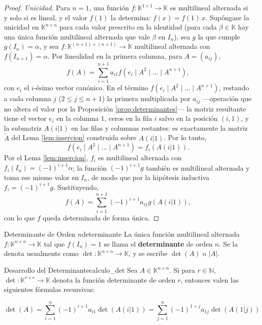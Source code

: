 \documentclass[11pt, a4paper]{article}
\begin{document}
\begin{proof}
\textit{Unicidad.} Para $n=1$, una función $f: \mathbb{K}^{1 \times 1} \to \mathbb{K}$ es multilineal alternada si y solo si es lineal, y el valor $f(1)$ la determina: $f(x) = f(1) \, x$. Supóngase la unicidad en $\mathbb{K}^{n \times n}$ para cada valor prescrito en la identidad (para cada $\beta \in \mathbb{K}$ hay una única función multilineal alternada que vale $\beta$ en $I_n$), sea $g$ la que cumple $g(I_n) = \alpha$, y sea $f: \mathbb{K}^{(n+1) \times (n+1)} \to \mathbb{K}$ multilineal alternada con $f(I_{n+1}) = \alpha$. Por linealidad en la primera columna, para $A = (a_{ij})$,
\[
f(A) = \sum_{i=1}^{n+1} a_{i1} f(e_i \mid A^2 \mid \dots \mid A^{n+1}),
\]
con $e_i$ el $i$-ésimo vector canónico. En el término $f(e_i \mid A^2 \mid \dots \mid A^{n+1})$, restando a cada columna $j$ ($2 \le j \le n+1$) la primera multiplicada por $a_{ij}$ —operación que no altera el valor por la Proposición \ref{prop:determinantes}— la matriz resultante tiene el vector $e_i$ en la columna $1$, ceros en la fila $i$ salvo en la posición $(i,1)$, y la submatriz $A(i|1)$ en las filas y columnas restantes: es exactamente la matriz $\tilde{A}$ del Lema \ref{lem:insercion} construida sobre $A(i|1)$. Por lo tanto,
\[
f(e_i \mid A^2 \mid \dots \mid A^{n+1}) = f_i(A(i|1)).
\]
Por el Lema \ref{lem:insercion}, $f_i$ es multilineal alternada con $f_i(I_n) = (-1)^{i+1} \alpha$; la función $(-1)^{i+1} g$ también es multilineal alternada y toma ese mismo valor en $I_n$, de modo que por la hipótesis inductiva $f_i = (-1)^{i+1} g$. Sustituyendo,
\[
f(A) = \sum_{i=1}^{n+1} (-1)^{i+1} a_{i1} g(A(i|1)),
\]
con lo que $f$ queda determinada de forma única.
\end{proof}

\begin{definicion}{Determinante de Orden $n$}{determinante}
La única función multilineal alternada $f: \mathbb{K}^{n \times n} \to \mathbb{K}$ tal que $f(I_n) = 1$ se llama el \textbf{determinante} de orden $n$.
Se la denota usualmente como $\det: \mathbb{K}^{n \times n} \to \mathbb{K}$, y se escribe $\det(A)$ o $|A|$.
\end{definicion}

\begin{corolario}{Desarrollo del Determinante}{calculo_det}
Sea $A \in \mathbb{K}^{n \times n}$. Si para $r \in \mathbb{N}$, $\det: \mathbb{K}^{r \times r} \to \mathbb{K}$ denota la función determinante de orden $r$, entonces valen las siguientes fórmulas recursivas:

\[ \det(A) = \sum_{i=1}^{n} (-1)^{i+1} a_{i1} \det(A(i|1)) = \sum_{j=1}^{n} (-1)^{1+j} a_{1j} \det(A(1|j)) \]
\end{corolario}
\end{document}
